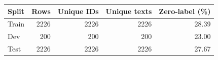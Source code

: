 \begin{tabular}{lrrrr}
\toprule
Split & Rows & Unique IDs & Unique texts & Zero-label (\%) \\
\midrule
Train & 2226 & 2226 & 2226 & 28.39 \\
Dev & 200 & 200 & 200 & 23.00 \\
Test & 2226 & 2226 & 2226 & 27.67 \\
\bottomrule
\end{tabular}
